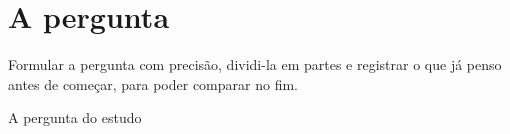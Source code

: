 \chapter{A pergunta}

\begin{objetivo}
Formular a pergunta com precisão, dividi-la em partes e registrar o que já
penso antes de começar, para poder comparar no fim.
\end{objetivo}

\begin{campo}{A pergunta do estudo}
\temaPergunta
\end{campo}

